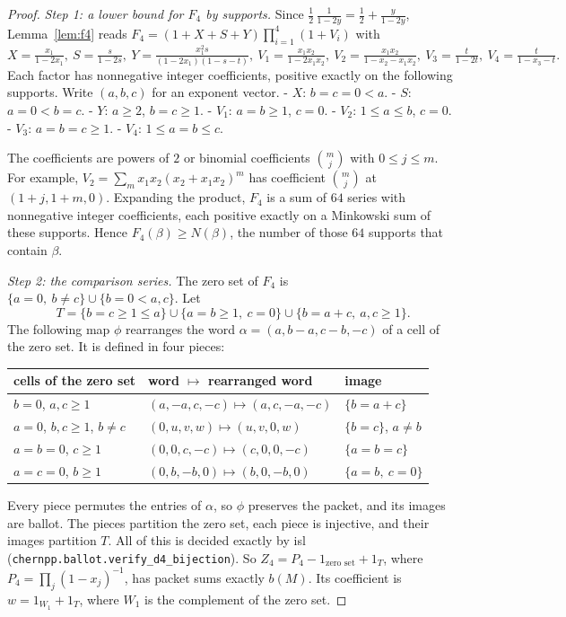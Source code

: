 \documentclass[11pt,a4paper]{article}
\theoremstyle{plain}
\theoremstyle{definition}
\theoremstyle{remark}
\begin{document}
\begin{proof}
\emph{Step 1: a lower bound for $F_4$ by supports.} Since $\tfrac12\,\frac{1}{1-2y} = \tfrac12 +
\frac{y}{1-2y}$, Lemma~\ref{lem:f4} reads $F_4 = (1 + X + S + Y)\prod_{i=1}^4 (1 + V_i)$ with
\[
  X = \tfrac{x_1}{1-2x_1},\ S = \tfrac{s}{1-2s},\ Y = \tfrac{x_1^2 s}{(1-2x_1)(1-s-t)},\
  V_1 = \tfrac{x_1x_2}{1-2x_1x_2},\ V_2 = \tfrac{x_1x_2}{1-x_2-x_1x_2},\
  V_3 = \tfrac{t}{1-2t},\ V_4 = \tfrac{t}{1-x_3-t}.
\]
Each factor has nonnegative integer coefficients, positive exactly on the following supports.
Write $(a,b,c)$ for an exponent vector.
- $X$: $b = c = 0 < a$.
- $S$: $a = 0 < b = c$.
- $Y$: $a \ge 2$, $b = c \ge 1$.
- $V_1$: $a = b \ge 1$, $c = 0$.
- $V_2$: $1 \le a \le b$, $c = 0$.
- $V_3$: $a = b = c \ge 1$.
- $V_4$: $1 \le a = b \le c$.

The coefficients are powers of $2$ or binomial coefficients $\binom mj$ with $0 \le j \le m$. For
example, $V_2 = \sum_m x_1x_2(x_2 + x_1x_2)^m$ has coefficient $\binom{m}{j}$ at $(1+j, 1+m, 0)$.
Expanding the product, $F_4$ is a sum of $64$ series with nonnegative integer coefficients, each
positive exactly on a Minkowski sum of these supports. Hence $F_4(\beta) \ge N(\beta)$, the number
of those $64$ supports that contain $\beta$.

\emph{Step 2: the comparison series.} The zero set of $F_4$ is
$\{a = 0,\ b \ne c\} \cup \{b = 0 < a, c\}$. Let
\[
  T = \{b = c \ge 1 \le a\} \cup \{a = b \ge 1,\ c = 0\} \cup \{b = a + c,\ a, c \ge 1\}.
\]
The following map $\phi$ rearranges the word $\alpha = (a, b-a, c-b, -c)$ of a cell of the zero set.
It is defined in four pieces:
\begin{center}\small
\begin{tabular}{@{}lll@{}}
\toprule
cells of the zero set & word $\mapsto$ rearranged word & image \\
\midrule
$b = 0$, $a, c \ge 1$ & $(a, -a, c, -c) \mapsto (a, c, -a, -c)$ & $\{b = a + c\}$ \\
$a = 0$, $b, c \ge 1$, $b \ne c$ & $(0, u, v, w) \mapsto (u, v, 0, w)$ & $\{b = c\}$, $a \ne b$ \\
$a = b = 0$, $c \ge 1$ & $(0, 0, c, -c) \mapsto (c, 0, 0, -c)$ & $\{a = b = c\}$ \\
$a = c = 0$, $b \ge 1$ & $(0, b, -b, 0) \mapsto (b, 0, -b, 0)$ & $\{a = b,\ c = 0\}$ \\
\bottomrule
\end{tabular}
\end{center}
Every piece permutes the entries of $\alpha$, so $\phi$ preserves the packet, and its images are
ballot. The pieces partition the zero set, each piece is injective, and their images partition $T$.
All of this is decided exactly by isl (\texttt{chernpp.ballot.verify\_d4\_bijection}). So
$Z_4 = P_4 - 1_{\text{zero set}} + 1_T$, where $P_4 = \prod_j (1-x_j)^{-1}$, has packet sums
exactly $b(M)$. Its coefficient is $w = 1_{W_1} + 1_T$, where $W_1$ is the complement of the zero
set.


\end{proof}
\end{document}
